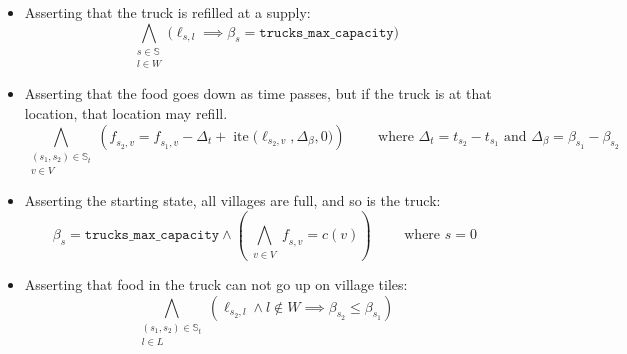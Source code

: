 \begin{itemize}
\[                            \Big) \implies \Big( 
                                \mathit{t}_{s_2} = \mathit{t}_{s_1} + d(r)
                            \Big)
                        \bigg)
                    \]
                \item 
                    Asserting that the truck is refilled at a supply:
                    \[
                        \bigwedge_{\substack{
                            s \in \mathbb{S} \\
                            l \in W
                        }} \bigg(
                            \ell_{s,l} \implies \beta_{s} = \texttt{trucks\_max\_capacity}
                        \bigg)
                    \]
                \item 
                    Asserting that the food goes down as time passes, but if
                    the truck is at that location, that location may refill.
                    \[
                        \bigwedge_{\substack{
                            (s_1,s_2) \in \mathbb{S}_t \\
                            v \in V
                        }}
                        \left(
                            \mathit{f}_{s_2,v}
                            =
                            \mathit{f}_{s_1,v}
                            -
                            \Delta_\mathit{t}
                            +
                            \operatorname{ite}\big(
                                \ell_{s_2,v}, 
                                \Delta_\beta, 
                                0
                            \big)
                        \right)
                        \qquad \text{ where } 
                            \Delta_\mathit{t} = \mathit{t}_{s_2} - \mathit{t}_{s_1}
                            \text{ and }
                            \Delta_\beta = \beta_{s_1} - \beta_{s_2}
                    \]
                \item 
                    Asserting the starting state, all villages are full, and so is the truck:
                    \[
                        \beta_{s} = \texttt{trucks\_max\_capacity}    
                        \wedge 
                        \left(
                            \bigwedge_{\substack{
                                v \in V
                            }} \mathit{f}_{s,v} = c(v)
                        \right)
                        \qquad \text{ where } 
                            s = 0
                    \]
                \item 
                    Asserting that food in the truck can not go up on village tiles:
                    \[
                        \bigwedge_{\substack{
                            (s_1, s_2) \in \mathbb{S}_t \\
                            l \in L
                        }}\left(
                            \ell_{s_2,l} \wedge l \not\in W \implies \beta_{s_2} \le \beta_{s_1}
                        \right)
                    \]
            \end{itemize}

